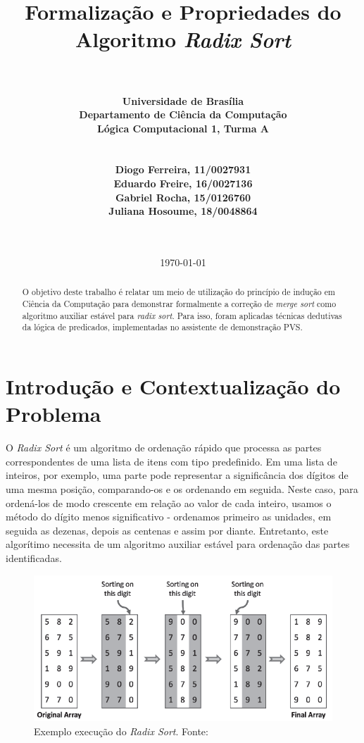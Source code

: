 \documentclass[a4paper, 12pt]{article}
\title{\Huge \bf
Formalização e Propriedades do Algoritmo \textit{Radix Sort}
}
\author{\\\\
        \bf Universidade de Brasília\\
        \bf Departamento de Ciência da Computação\\
        \bf Lógica Computacional 1, Turma A\\
        \\\\
        Diogo Ferreira, 11/0027931\\
        Eduardo Freire, 16/0027136\\
        Gabriel Rocha, 15/0126760\\
        Juliana Hosoume, 18/0048864\\
        \\\\}
\date{\today}
\begin{document}
\maketitle
\thispagestyle{empty}

\begin{abstract}

O objetivo deste trabalho é relatar um meio de utilização do princípio de indução em Ciência da Computação para demonstrar formalmente a correção de \textit{merge sort} como algoritmo auxiliar estável para \textit{radix sort}. Para isso, foram aplicadas técnicas dedutivas da lógica de predicados, implementadas no assistente de demonstração PVS.

\end{abstract}

\newpage
\tableofcontents
\newpage

\section{Introdução e Contextualização do Problema}
\label{sec:Introducao}

O \textit{Radix Sort} é um algoritmo de ordenação rápido que processa as partes correspondentes de uma lista de itens com tipo predefinido. Em uma lista de inteiros, por exemplo, uma parte pode representar a significância dos dígitos de uma mesma posição, comparando-os e os ordenando em seguida. Neste caso, para ordená-los de modo crescente em relação ao valor de cada inteiro, usamos o método do dígito menos significativo - ordenamos primeiro as unidades, em seguida as dezenas, depois as centenas e assim por diante. Entretanto, este algorítimo necessita de um algoritmo auxiliar estável para ordenação das partes identificadas.

\begin{figure}[!h]
\centering
\includegraphics[width=1\textwidth]{radix1.png}
\caption{Exemplo execução do \textit{Radix Sort}. Fonte: \cite{ritambhara_radix_nodate}}
\label{fig:radix1}
\end{figure}
\end{document}
